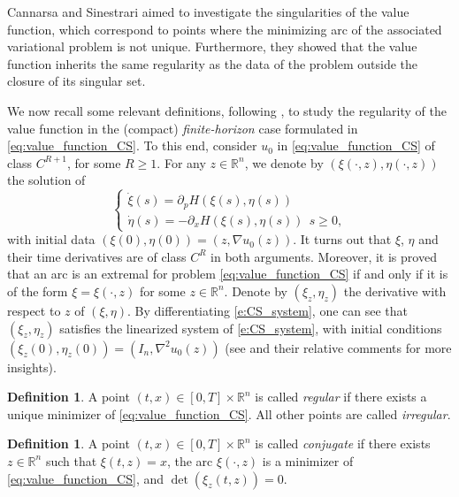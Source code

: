 \documentclass[a4paper,10pt]{amsart}
\theoremstyle{plain}
\theoremstyle{definition}
\newtheorem{defn}[thm]{Definition}
\numberwithin{equation}{section}
\numberwithin{thm}{section}
\begin{document}
Cannarsa and Sinestrari aimed to investigate the singularities of the value function, which correspond to points where the minimizing arc of the associated variational problem is not unique. Furthermore, they showed that the value function inherits the same regularity as the data of the problem outside the closure of its singular set.

We now recall some relevant definitions, following \cite{MR2041617}, to study the regularity of the value function in the (compact) {\em finite-horizon} case formulated in \eqref{eq:value_function_CS}. To this end, consider $u_0$ in \eqref{eq:value_function_CS} of class $C^{R+1}$, for some $R\ge 1$. For any $z \in \mathbb R^n$, we denote by $(\xi(\cdot,z),\eta(\cdot,z))$ the solution of 
\begin{equation}
\label{e:CS_system}
\begin{cases}
\dot \xi(s)=\partial_p H(\xi(s), \eta(s))
\\
\dot \eta (s)=-\partial_x H(\xi(s),\eta(s)) \ \ s\ge 0,
\end{cases}
\end{equation}
with initial data $(\xi(0),\eta(0))=(z, \nabla u_0(z))$. It turns out that $\xi$, $\eta$ and their time derivatives are of class $C^R$ in both arguments. Moreover, it is proved that an arc is an extremal for problem \eqref{eq:value_function_CS} if and only if it is of the form $\xi=\xi(\cdot, z)$ for some $z \in \mathbb R^n$. Denote by $(\xi_z,\eta_z)$ the derivative with respect to $z$ of $(\xi,\eta)$. By differentiating  \eqref{e:CS_system}, one can see that $(\xi_z, \eta_z)$ satisfies the linearized system of  \eqref{e:CS_system}, with initial conditions $(\xi_z(0), \eta_z(0))=(I_n, \nabla^2 u_0(z))$ (see \cite[(6.15)--(6.18)]{MR2041617} and their relative comments for more insights).


\begin{defn}
\label{def:CS_irregular_points}
A point $(t,x)\in[0,T]\times\mathbb{R}^n$ is called \emph{regular} if there exists a unique minimizer of \eqref{eq:value_function_CS}. All other points are called \emph{irregular}.
\end{defn}

\begin{defn}
\label{def:CS_conjugate_points}
A point $(t,x)\in[0,T]\times\mathbb{R}^n$ is called \emph{conjugate} if there exists $z\in\mathbb{R}^n$ such that $\xi(t,z)=x$, the arc $\xi(\cdot,z)$ is a minimizer of \eqref{eq:value_function_CS}, and $\det(\xi_z(t,z)) = 0$.
\end{defn}
\end{document}
